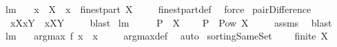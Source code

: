 \begin{isabellebody}
\ lm{}{}{}{\isacharcolon}\ \isanewline
\ \ {\isachardoublequoteopen}x\ {\isasymin}\ X\ {\isacharequal}\ {\isacharparenleft}{\isacharbraceleft}x{\isacharbraceright}\ {\isasymin}\ finestpart\ X{\isacharparenright}{\isachardoublequoteclose}\ \isanewline
%
\isadelimproof
\ \ %
\endisadelimproof
%
\isatagproof
{}\isamarkupfalse%
\ finestpart{\isacharunderscore}def\ \isamarkupfalse%
\ force%
\endisatagproof
{\isafoldproof}%
%
\isadelimproof
\isanewline
%
\endisadelimproof
\isanewline
{}\isamarkupfalse%
\ pairDifference{\isacharcolon}\ \isanewline
\ \ {\isachardoublequoteopen}{\isacharbraceleft}{\isacharparenleft}x{\isacharcomma}X{\isacharparenright}{\isacharbraceright}{\isacharminus}{\isacharbraceleft}{\isacharparenleft}x{\isacharcomma}Y{\isacharparenright}{\isacharbraceright}\ {\isacharequal}\ {\isacharbraceleft}x{\isacharbraceright}{\isasymtimes}{\isacharparenleft}{\isacharbraceleft}X{\isacharbraceright}{\isacharminus}{\isacharbraceleft}Y{\isacharbraceright}{\isacharparenright}{\isachardoublequoteclose}\ \isanewline
%
\isadelimproof
\ \ %
\endisadelimproof
%
\isatagproof
{}\isamarkupfalse%
\ blast%
\endisatagproof
{\isafoldproof}%
%
\isadelimproof
\isanewline
%
\endisadelimproof
\isanewline
{}\isamarkupfalse%
\ lm{}{}{}{\isacharcolon}\ \isanewline
\ \ \ {\isachardoublequoteopen}{\isasymUnion}\ P\ {\isacharequal}\ X{\isachardoublequoteclose}\ \isanewline
\ \ \ {\isachardoublequoteopen}P\ {\isasymsubseteq}\ Pow\ X{\isachardoublequoteclose}\ \isanewline
%
\isadelimproof
\ \ %
\endisadelimproof
%
\isatagproof
{}\isamarkupfalse%
\ assms\ \isamarkupfalse%
\ blast%
\endisatagproof
{\isafoldproof}%
%
\isadelimproof
\isanewline
%
\endisadelimproof
\isanewline
{}\isamarkupfalse%
\ lm{}{}{}{\isacharcolon}\ \isanewline
\ \ {\isachardoublequoteopen}argmax\ f\ {\isacharbraceleft}x{\isacharbraceright}\ {\isacharequal}\ {\isacharbraceleft}x{\isacharbraceright}{\isachardoublequoteclose}\ \isanewline
%
\isadelimproof
\ \ %
\endisadelimproof
%
\isatagproof
{}\isamarkupfalse%
\ argmax{\isacharunderscore}def\ \isamarkupfalse%
\ auto%
\endisatagproof
{\isafoldproof}%
%
\isadelimproof
\isanewline
%
\endisadelimproof
\isanewline
{}\isamarkupfalse%
\ sortingSameSet{\isacharcolon}\ \isanewline
\ \ \ {\isachardoublequoteopen}finite\ X{\isachardoublequoteclose}\ \isanewline

\end{isabellebody}
